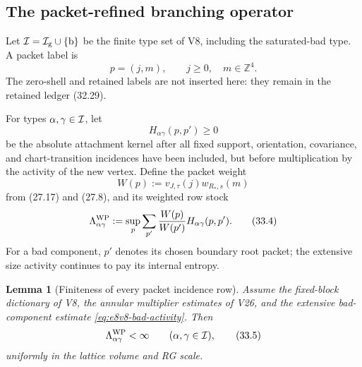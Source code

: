 \documentclass[11pt,oneside]{book}
\newtheorem{lemma}[theorem]{Lemma}
\theoremstyle{definition}
\theoremstyle{remark}
\begin{document}
\subsection{The packet-refined branching operator}

Let \({\cal I}={\cal I}_{\rm g}\cup\{{\rm b}\}\) be the finite type
set of V8, including the saturated-bad type.  A packet label is
\[
                         p=(j,m),\qquad
 j\geq0,\quad m\in{\mathbb Z}^4.                                \tag{33.1}
\]
The zero-shell and retained labels are not inserted here: they remain
in the retained ledger (32.29).

For types \(\alpha,\gamma\in{\cal I}\), let
\[
 H_{\alpha\gamma}(p,p')\geq0                                   \tag{33.2}
\]
be the absolute attachment kernel after all fixed support,
orientation, covariance, and chart-transition incidences have been
included, but before multiplication by the activity of the new
vertex.  Define the packet weight
\[
 W(p):=v_{J,\tau}(j)w_{R_*,s}(m)                                \tag{33.3}
\]
from (27.17) and (27.8), and its weighted row stock
\[
 \Lambda_{\alpha\gamma}^{\rm WP}
 :=
 \sup_p\sum_{p'}
 \frac{W(p)}{W(p')}H_{\alpha\gamma}(p,p').                       \tag{33.4}
\]
For a bad component, \(p'\) denotes its chosen boundary root packet;
the extensive size activity continues to pay its internal entropy.

\begin{lemma}[Finiteness of every packet incidence row]
\label{lem:e8v33-packet-incidence}
Assume the fixed-block dictionary of V8, the annular multiplier
estimates of V26, and the extensive bad-component estimate
\eqref{eq:e8v8-bad-activity}.  Then
\[
                \Lambda_{\alpha\gamma}^{\rm WP}<\infty
                \qquad(\alpha,\gamma\in{\cal I}),                \tag{33.5}
\]
uniformly in the lattice volume and RG scale.
\end{lemma}
\end{document}
